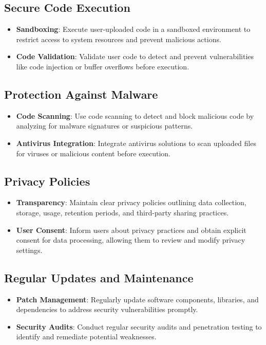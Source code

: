 \subsection{Secure Code Execution}
\begin{itemize}
	\item \textbf{Sandboxing}: Execute user-uploaded code in a sandboxed environment to restrict access to system resources and prevent malicious actions.
	\item \textbf{Code Validation}: Validate user code to detect and prevent vulnerabilities like code injection or buffer overflows before execution.
\end{itemize}

\subsection{Protection Against Malware}
\begin{itemize}
	\item \textbf{Code Scanning}: Use code scanning to detect and block malicious code by analyzing for malware signatures or suspicious patterns.
	\item \textbf{Antivirus Integration}: Integrate antivirus solutions to scan uploaded files for viruses or malicious content before execution.
\end{itemize}

\subsection{Privacy Policies}
\begin{itemize}
	\item \textbf{Transparency}: Maintain clear privacy policies outlining data collection, storage, usage, retention periods, and third-party sharing practices.
	\item \textbf{User Consent}: Inform users about privacy practices and obtain explicit consent for data processing, allowing them to review and modify privacy settings.
\end{itemize}

\subsection{Regular Updates and Maintenance}
\begin{itemize}
	\item \textbf{Patch Management}: Regularly update software components, libraries, and dependencies to address security vulnerabilities promptly.
	\item \textbf{Security Audits}: Conduct regular security audits and penetration testing to identify and remediate potential weaknesses.
\end{itemize}

